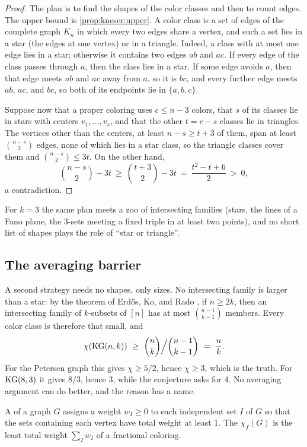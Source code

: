 \begin{refsection}
\begin{proof}
The plan is to find the shapes of the color classes and then to count edges. The upper bound is \cref{prop:kneser:upper}. A color class is a set of edges of the complete graph $K_n$ in which every two edges share a vertex, and such a set lies in a star (the edges at one vertex) or in a triangle. Indeed, a class with at most one edge lies in a star; otherwise it contains two edges $ab$ and $ac$. If every edge of the class passes through $a$, then the class lies in a star. If some edge avoids $a$, then that edge meets $ab$ and $ac$ away from $a$, so it is $bc$, and every further edge meets $ab$, $ac$, and $bc$, so both of its endpoints lie in $\{a,b,c\}$.

Suppose now that a proper coloring uses $c\le n-3$ colors, that $s$ of its classes lie in stars with centers $v_1,\dots,v_s$, and that the other $t=c-s$ classes lie in triangles. The vertices other than the centers, at least $n-s\ge t+3$ of them, span at least $\binom{n-s}{2}$ edges, none of which lies in a star class, so the triangle classes cover them and $\binom{n-s}{2}\le3t$. On the other hand,
\[
\binom{n-s}{2}-3t\ \ge\ \binom{t+3}{2}-3t\ =\ \frac{t^2-t+6}{2}\ >\ 0,
\]
a contradiction.
\end{proof}

For $k=3$ the same plan meets a zoo of intersecting families (stars, the lines of a Fano plane, the $3$-sets meeting a fixed triple in at least two points), and no short list of shapes plays the role of ``star or triangle''.

\subsection{The averaging barrier}

A second strategy needs no shapes, only sizes. No intersecting family is larger than a star: by the theorem of Erd\H{o}s, Ko, and Rado \parencite{ErdosKoRado1961}, if $n\ge2k$, then an intersecting family of $k$-subsets of $[n]$ has at most $\binom{n-1}{k-1}$ members. Every color class is therefore that small, and
\[
\chi(\mathrm{KG}(n,k))\ \ge\ \binom nk\Big/\binom{n-1}{k-1}\ =\ \frac nk .
\]
%
For the Petersen graph this gives $\chi\ge5/2$, hence $\chi\ge3$, which is the truth. For $\mathrm{KG}(8,3)$ it gives $8/3$, hence $3$, while the conjecture asks for $4$. No averaging argument can do better, and the reason has a name.

\begin{definition}\label{def:kneser:frac}
A  of a graph $G$ assigns a weight $w_I\ge0$ to each independent set $I$ of $G$ so that the sets containing each vertex have total weight at least $1$. The  $\chi_f(G)$ is the least total weight $\sum_I w_I$ of a fractional coloring.
\end{definition}


\end{refsection}
